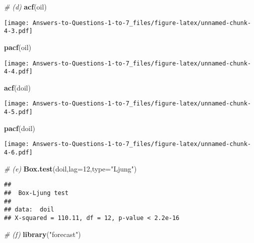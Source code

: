 \documentclass[
]{article}
\newenvironment{Shaded}{\begin{snugshade}}{\end{snugshade}}
\newcommand{\AttributeTok}[1]{\textcolor[rgb]{0.13,0.29,0.53}{#1}}
\newcommand{\CommentTok}[1]{\textcolor[rgb]{0.56,0.35,0.01}{\textit{#1}}}
\newcommand{\DecValTok}[1]{\textcolor[rgb]{0.00,0.00,0.81}{#1}}
\newcommand{\FunctionTok}[1]{\textcolor[rgb]{0.13,0.29,0.53}{\textbf{#1}}}
\newcommand{\NormalTok}[1]{#1}
\newcommand{\StringTok}[1]{\textcolor[rgb]{0.31,0.60,0.02}{#1}}
\begin{document}
\begin{Shaded}
\begin{Highlighting}[]
\CommentTok{\# (d)}
\FunctionTok{acf}\NormalTok{(oil)}
\end{Highlighting}
\end{Shaded}

\texttt{[image: Answers-to-Questions-1-to-7\_files/figure-latex/unnamed-chunk-4-3.pdf]}

\begin{Shaded}
\begin{Highlighting}[]
\FunctionTok{pacf}\NormalTok{(oil)}
\end{Highlighting}
\end{Shaded}

\texttt{[image: Answers-to-Questions-1-to-7\_files/figure-latex/unnamed-chunk-4-4.pdf]}

\begin{Shaded}
\begin{Highlighting}[]
\FunctionTok{acf}\NormalTok{(doil)}
\end{Highlighting}
\end{Shaded}

\texttt{[image: Answers-to-Questions-1-to-7\_files/figure-latex/unnamed-chunk-4-5.pdf]}

\begin{Shaded}
\begin{Highlighting}[]
\FunctionTok{pacf}\NormalTok{(doil)}
\end{Highlighting}
\end{Shaded}

\texttt{[image: Answers-to-Questions-1-to-7\_files/figure-latex/unnamed-chunk-4-6.pdf]}

\begin{Shaded}
\begin{Highlighting}[]
\CommentTok{\# (e)}
\FunctionTok{Box.test}\NormalTok{(doil,}\AttributeTok{lag=}\DecValTok{12}\NormalTok{,}\AttributeTok{type=}\StringTok{"Ljung"}\NormalTok{)}
\end{Highlighting}
\end{Shaded}

\begin{verbatim}
## 
##  Box-Ljung test
## 
## data:  doil
## X-squared = 110.11, df = 12, p-value < 2.2e-16
\end{verbatim}

\begin{Shaded}
\begin{Highlighting}[]
\CommentTok{\# (f)}
\FunctionTok{library}\NormalTok{(}\StringTok{"forecast"}\NormalTok{)}
\end{Highlighting}
\end{Shaded}
\end{document}
